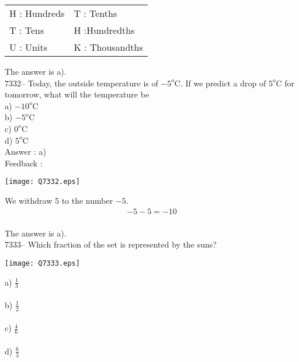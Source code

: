 \documentclass[letterpaper, 12pt]{article}
\begin{document}
\scriptsize
\begin{center}
\begin{tabular}{ll}
H : Hundreds & T\up{th} : Tenths\\
T : Tens & H\up{th} :Hundredths\\
U : Units & K\up{e} : Thousandths\\
\end{tabular}
\end{center}

\normalsize

The answer is a).\\


7332-- Today, the outside temperature is of $-5^{o}$C. If we predict a drop of $5^{o}$C for tomorrow, what will the temperature \mbox{be}\\

a) $-10^{o}$C\\
b) $-5^{o}$C\\
c) $0^{o}$C\\
d) $5^{o}$C\\

Answer : a)\\

Feedback :\\
\begin{center}
\texttt{[image: Q7332.eps]}
\end{center}

We withdraw 5 to the number $- 5$.\\
\begin{eqnarray*}
-5 - 5 = - 10\\
\end{eqnarray*}

The answer is a).\\





7333-- Which fraction of the set is represented by the suns?

\begin{center}
    \texttt{[image: Q7333.eps]}
    \end{center}


a) $\frac{1}{3}$\\\\
b) $\frac{1}{2}$\\\\
c) $\frac{4}{6}$\\\\
d) $\frac{6}{3}$\\\\
\end{document}
